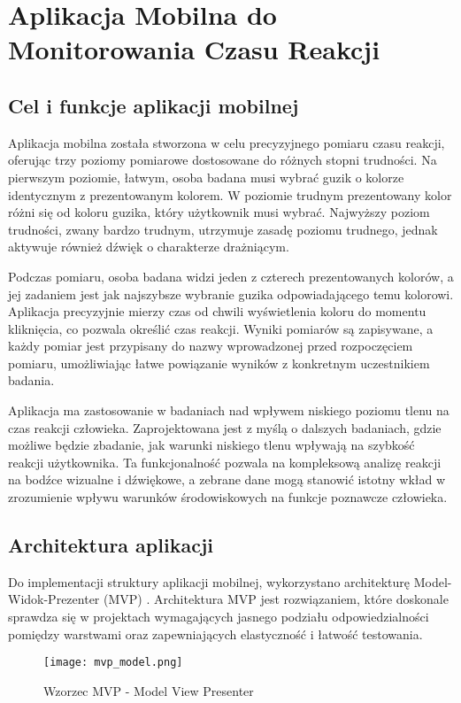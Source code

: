 \chapter{Aplikacja Mobilna do Monitorowania Czasu Reakcji}
\section{Cel i funkcje aplikacji mobilnej}
Aplikacja mobilna została stworzona w celu precyzyjnego pomiaru czasu reakcji, oferując trzy poziomy pomiarowe dostosowane do różnych stopni trudności. Na pierwszym poziomie, łatwym, osoba badana musi wybrać guzik o kolorze identycznym z prezentowanym kolorem. W poziomie trudnym prezentowany kolor różni się od koloru guzika, który użytkownik musi wybrać. Najwyższy poziom trudności, zwany bardzo trudnym, utrzymuje zasadę poziomu trudnego, jednak aktywuje również dźwięk o charakterze drażniącym.

Podczas pomiaru, osoba badana widzi jeden z czterech prezentowanych kolorów, a jej zadaniem jest jak najszybsze wybranie guzika odpowiadającego temu kolorowi. Aplikacja precyzyjnie mierzy czas od chwili wyświetlenia koloru do momentu kliknięcia, co pozwala określić czas reakcji. Wyniki pomiarów są zapisywane, a każdy pomiar jest przypisany do nazwy wprowadzonej przed rozpoczęciem pomiaru, umożliwiając łatwe powiązanie wyników z konkretnym uczestnikiem badania.

Aplikacja ma zastosowanie w badaniach nad wpływem niskiego poziomu tlenu na czas reakcji człowieka. Zaprojektowana jest z myślą o dalszych badaniach, gdzie możliwe będzie zbadanie, jak warunki niskiego tlenu wpływają na szybkość reakcji użytkownika. Ta funkcjonalność pozwala na kompleksową analizę reakcji na bodźce wizualne i dźwiękowe, a zebrane dane mogą stanowić istotny wkład w zrozumienie wpływu warunków środowiskowych na funkcje poznawcze człowieka.

\section{Architektura aplikacji}
Do implementacji struktury aplikacji mobilnej, wykorzystano architekturę Model-Widok-Prezenter (MVP) . Architektura MVP jest rozwiązaniem, które doskonale sprawdza się w projektach wymagających jasnego podziału odpowiedzialności pomiędzy warstwami oraz zapewniających elastyczność i łatwość testowania. 
\begin{figure}[!htb]
    \centering
    \texttt{[image: mvp\_model.png]}
    \caption{Wzorzec MVP - Model View Presenter~\cite{MVP}}
\end{figure}


